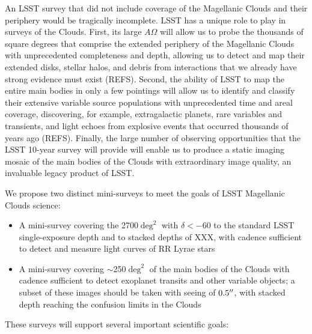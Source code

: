 An LSST survey that did not include coverage of the Magellanic Clouds and their periphery would be tragically incomplete.  LSST has a unique role to play in surveys of the Clouds.  First, its large $A\Omega$ will allow us to probe the thousands of square degrees that comprise the extended periphery of the Magellanic Clouds with unprecedented completeness and depth, allowing us to detect and map their extended disks, stellar halos, and debris from interactions that we already have strong evidence must exist (REFS).  Second, the ability of LSST to map the entire main bodies in only a few pointings will allow us to identify and classify their extensive variable source populations with unprecedented time and areal coverage, discovering, for example, extragalactic planets, rare variables and transients, and light echoes from explosive events that occurred thousands of years ago (REFS).  Finally, the large number of observing opportunities that the LSST 10-year survey will provide will enable us to produce a static imaging mosaic of the main bodies of the Clouds with extraordinary image quality, an invaluable legacy product of LSST.

We propose two distinct mini-surveys to meet the goals of LSST Magellanic Clouds science:
\begin{itemize}
\item A mini-survey covering the 2700$\deg^2$ with $\delta < -60$ to the standard LSST single-exposure depth and to stacked depths of XXX, with cadence sufficient to detect and measure light curves of RR Lyrae stars 
\item A mini-survey covering $\sim$250$\deg^2$ of the main bodies of the Clouds with cadence sufficient to detect exoplanet transits and other variable objects; a subset of these images should be taken with seeing of $0.5''$, with stacked depth reaching the confusion limits in the Clouds
\end{itemize}

These surveys will support several important scientific goals:

